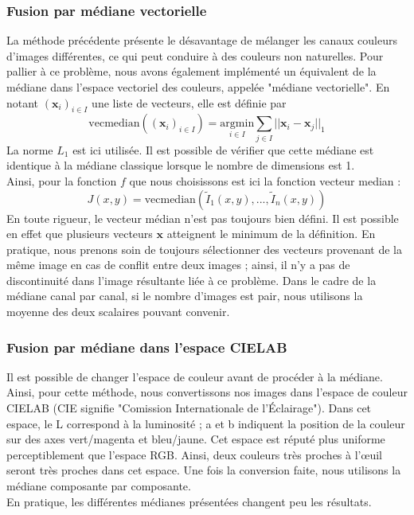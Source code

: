 \documentclass[12pt,a4paper]{article}
\begin{document}
\subsubsection{Fusion par médiane vectorielle}
\label{fusiontruemediane}
La méthode précédente présente le désavantage de mélanger les canaux couleurs d'images différentes, ce qui peut conduire à des couleurs non naturelles. Pour pallier à ce problème, nous avons également implémenté un équivalent de la médiane dans l'espace vectoriel des couleurs, appelée "médiane vectorielle". En notant $(\mathbf{x}_i)_{i \in I}$ une liste de vecteurs, elle est définie par
\[
\mathrm{vecmedian}\left((\mathbf{x}_i)_{i \in I}\right) = \underset{i \in I}{\mathrm{argmin}} \sum_{j \in I} ||\mathbf{x}_i-\mathbf{x}_j||_1
\]
La norme $L_1$ est ici utilisée. Il est possible de vérifier que cette médiane est identique à la médiane classique lorsque le nombre de dimensions est 1. \\
Ainsi, pour la fonction $f$ que nous choisissons est ici la fonction vecteur median :
\[
J(x,y)=\mathrm{vecmedian}\left(\tilde I_1(x,y), ..., \tilde I_n(x,y)\right)
\]
En toute rigueur, le vecteur médian n'est pas toujours bien défini. Il est possible en effet que plusieurs vecteurs $\mathbf{x}$ atteignent le minimum de la définition. En pratique, nous prenons soin de toujours sélectionner des vecteurs provenant de la même image en cas de conflit entre deux images ; ainsi, il n'y a pas de discontinuité dans l'image résultante liée à ce problème. Dans le cadre de la médiane canal par canal, si le nombre d'images est pair, nous utilisons la moyenne des deux scalaires pouvant convenir.
\subsubsection{Fusion par médiane dans l'espace CIELAB}
\label{fusionlab}
Il est possible de changer l'espace de couleur avant de procéder à la médiane. Ainsi, pour cette méthode, nous convertissons nos images dans l'espace de couleur CIELAB (CIE signifie "Comission Internationale de l'Éclairage"). Dans cet espace, le L correspond à la luminosité ; a et b indiquent la position de la couleur sur des axes vert/magenta et bleu/jaune. Cet espace est réputé plus uniforme perceptiblement que l'espace RGB. Ainsi, deux couleurs très proches à l'œuil seront très proches dans cet espace. Une fois la conversion faite, nous utilisons la médiane composante par composante.\\
En pratique, les différentes médianes présentées changent peu les résultats.
\end{document}

